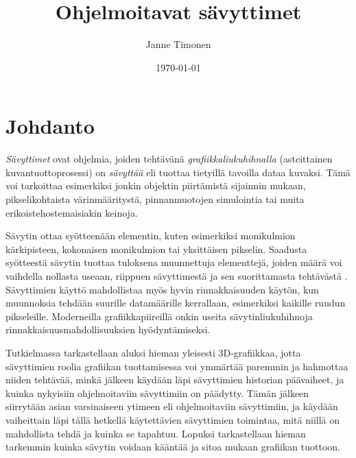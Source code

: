 \documentclass[finnish]{tktltiki2}
\title{Ohjelmoitavat sävyttimet}
\author{Janne Timonen}
\date{\today}
\theoremstyle{definition}
\theoremstyle{remark}
\begin{document}

\frontmatter      %

\maketitle        %
\makeabstract     %

\tableofcontents  %


\mainmatter       %

\section{Johdanto}


\emph{Sävyttimet} ovat ohjelmia, joiden tehtävänä \emph{grafiikkaliukuhihnalla} (asteittainen kuvantuottoprosessi) on \emph{sävyttää} eli tuottaa tietyillä tavoilla dataa kuvaksi. Tämä voi tarkoittaa esimerkiksi jonkin objektin piirtämistä sijainnin mukaan, pikselikohtaista värinmääritystä, pinnanmuotojen simulointia tai muita erikoistehostemaisiakin keinoja. 

Sävytin ottaa syötteenään elementin, kuten esimerkiksi monikulmion kärkipisteen, kokonaisen monikulmion tai yksittäisen pikselin. Saadusta syötteestä sävytin tuottaa tuloksena muunnettuja elementtejä, joiden määrä voi vaihdella nollasta useaan, riippuen sävyttimestä ja sen suorittamasta tehtävästä \cite[s. 500]{Gre14}. Sävyttimien käyttö mahdollistaa myös hyvin rinnakkaisuuden käytön, kun muunnoksia tehdään suurille datamäärille kerrallaan, esimerkiksi kaikille ruudun pikseleille. Moderneilla grafiikkapiireillä onkin useita sävytinliukuhihnoja rinnakkaisuusmahdollisuuksien hyödyntämiseksi.

Tutkielmassa tarkastellaan aluksi hieman yleisesti 3D-grafiikkaa, jotta sävyttimien roolia grafiikan tuottamisessa voi ymmärtää paremmin ja hahmottaa niiden tehtävää, minkä jälkeen käydään läpi sävyttimien historian päävaiheet, ja kuinka nykyisiin ohjelmoitaviin sävyttimiin on päädytty. Tämän jälkeen siirrytään asian varsinaiseen ytimeen eli ohjelmoitaviin sävyttimiin, ja käydään vaiheittain läpi tällä hetkellä käytettävien sävyttimien toimintaa, mitä niillä on mahdollista tehdä ja kuinka se tapahtuu. Lopuksi tarkastellaan hieman tarkemmin kuinka sävytin voidaan kääntää ja sitoa mukaan grafiikan tuottoon.
\end{document}
